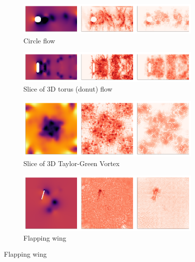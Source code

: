 \documentclass[review]{elsarticle}
\begin{document}
\begin{figure}
    \centering
    \begin{subfigure}[a]{\textwidth}
        \centering 
        \includegraphics[width=\textwidth]{figures/circletriple.png}
        \caption[-1mm]{Circle flow}
    \end{subfigure}
    \begin{subfigure}[b]{\textwidth}
        \centering
        \includegraphics[width=\textwidth]{figures/donuttriple.png}
        \caption{Slice of 3D torus (donut) flow}
    \end{subfigure}
    \begin{subfigure}[c]{0.6\textwidth}
        \centering
        \includegraphics[width=\textwidth]{figures/TGVtriple.png}
        \caption{Slice of 3D Taylor-Green Vortex}
    \end{subfigure}
    \begin{subfigure}[c]{0.6\textwidth}
        \centering
        \includegraphics[width=\textwidth]{figures/wingtriple.png}
        \caption{Flapping wing}
    \end{subfigure}

\end{figure}
\end{document}
